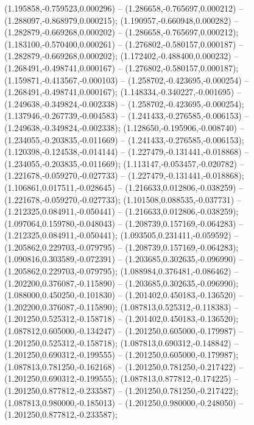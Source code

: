  (1.195858,-0.759523,0.000296) -- (1.286658,-0.765697,0.000212) -- (1.288097,-0.868979,0.000215);
 (1.190957,-0.660948,0.000282) -- (1.282879,-0.669268,0.000202) -- (1.286658,-0.765697,0.000212);
 (1.183100,-0.570400,0.000261) -- (1.276802,-0.580157,0.000187) -- (1.282879,-0.669268,0.000202);
 (1.172402,-0.488400,0.000232) -- (1.268491,-0.498741,0.000167) -- (1.276802,-0.580157,0.000187);
 (1.159871,-0.413567,-0.000103) -- (1.258702,-0.423695,-0.000254) -- (1.268491,-0.498741,0.000167);
 (1.148334,-0.340227,-0.001695) -- (1.249638,-0.349824,-0.002338) -- (1.258702,-0.423695,-0.000254);
 (1.137946,-0.267739,-0.004583) -- (1.241433,-0.276585,-0.006153) -- (1.249638,-0.349824,-0.002338);
 (1.128650,-0.195906,-0.008740) -- (1.234055,-0.203835,-0.011669) -- (1.241433,-0.276585,-0.006153);
 (1.120398,-0.124538,-0.014144) -- (1.227479,-0.131441,-0.018868) -- (1.234055,-0.203835,-0.011669);
 (1.113147,-0.053457,-0.020782) -- (1.221678,-0.059270,-0.027733) -- (1.227479,-0.131441,-0.018868);
 (1.106861,0.017511,-0.028645) -- (1.216633,0.012806,-0.038259) -- (1.221678,-0.059270,-0.027733);
 (1.101508,0.088535,-0.037731) -- (1.212325,0.084911,-0.050441) -- (1.216633,0.012806,-0.038259);
 (1.097064,0.159780,-0.048043) -- (1.208739,0.157169,-0.064283) -- (1.212325,0.084911,-0.050441);
 (1.093505,0.231411,-0.059592) -- (1.205862,0.229703,-0.079795) -- (1.208739,0.157169,-0.064283);
 (1.090816,0.303589,-0.072391) -- (1.203685,0.302635,-0.096990) -- (1.205862,0.229703,-0.079795);
 (1.088984,0.376481,-0.086462) -- (1.202200,0.376087,-0.115890) -- (1.203685,0.302635,-0.096990);
 (1.088000,0.450250,-0.101830) -- (1.201402,0.450183,-0.136520) -- (1.202200,0.376087,-0.115890);
 (1.087813,0.525312,-0.118383) -- (1.201250,0.525312,-0.158718) -- (1.201402,0.450183,-0.136520);
 (1.087812,0.605000,-0.134247) -- (1.201250,0.605000,-0.179987) -- (1.201250,0.525312,-0.158718);
 (1.087813,0.690312,-0.148842) -- (1.201250,0.690312,-0.199555) -- (1.201250,0.605000,-0.179987);
 (1.087813,0.781250,-0.162168) -- (1.201250,0.781250,-0.217422) -- (1.201250,0.690312,-0.199555);
 (1.087813,0.877812,-0.174225) -- (1.201250,0.877812,-0.233587) -- (1.201250,0.781250,-0.217422);
 (1.087813,0.980000,-0.185013) -- (1.201250,0.980000,-0.248050) -- (1.201250,0.877812,-0.233587);

